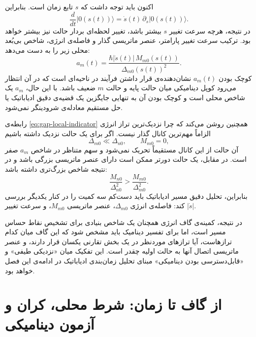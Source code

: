 اکنون باید توجه داشت که $s$ تابع زمان است. بنابراین
\begin{equation}
	\frac{d}{dt}|0(s(t))\rangle
	=
	\dot{s}(t)\,\partial_s|0(s(t))\rangle.
	\label{eq:time-dependent-ground-state}
\end{equation}
در نتیجه، هرچه سرعت تغییر $s$ بیشتر باشد، تغییر لحظه‌ای بردار حالت
نیز بیشتر خواهد بود. ترکیب سرعت تغییر پارامتر، عنصر ماتریسی گذار و
فاصله‌ی انرژی، شاخص بی‌بُعد محلی زیر را به دست می‌دهد:
\begin{equation}
	a_m(t)
	=
	\frac{
		\hbar|\dot{s}(t)|\,M_{m0}(s(t))
	}{
		\Delta_{m0}(s(t))^2
	}.
	\label{eq:gap-local-indicator}
\end{equation}
کوچک بودن $a_m(t)$ نشان‌دهنده‌ی قرار داشتن فرآیند در ناحیه‌ای است
که در آن انتظار می‌رود کوپل دینامیکی میان حالت پایه و حالت $m$
ضعیف باشد. با این حال، $a_m$ یک شاخص محلی است و کوچک بودن آن به
تنهایی جایگزین یک قضیه‌ی دقیق ادیاباتیک یا حل مستقیم معادله‌ی
شرودینگر نمی‌شود.

رابطه‌ی \eqref{eq:gap-local-indicator} همچنین روشن می‌کند که چرا
نزدیک‌ترین تراز انرژی الزاماً مهم‌ترین کانال گذار نیست. اگر برای
یک حالت نزدیک داشته باشیم
\begin{equation}
	\Delta_{m0}\ll\Delta_{n0},
	\qquad
	M_{m0}=0,
\end{equation}
آن حالت از این کانال مستقیماً تحریک نمی‌شود و سهم متناظر در
شاخص $a_m$ صفر است. در مقابل، یک حالت دورتر ممکن است دارای عنصر
ماتریسی بزرگی باشد و در نتیجه شاخص بزرگ‌تری داشته باشد:
\begin{equation}
	\frac{M_{n0}}{\Delta_{n0}^2}
	>
	\frac{M_{m0}}{\Delta_{m0}^2}.
\end{equation}
بنابراین، تحلیل دقیق مسیر ادیاباتیک باید دست‌کم سه کمیت را در کنار
یکدیگر بررسی کند: فاصله‌ی انرژی $\Delta_{m0}$، عنصر ماتریسی
$M_{m0}$، و سرعت تغییر $|\dot{s}|$.

در نتیجه، کمینه‌ی گاف انرژی همچنان یک شاخص بنیادی برای تشخیص نقاط
حساس مسیر است، اما برای تفسیر دینامیک باید مشخص شود که این گاف
میان کدام ترازهاست، آیا ترازهای موردنظر در یک بخش تقارنی یکسان
قرار دارند، و عنصر ماتریسی اتصال آنها به حالت اولیه چقدر است.
این تفکیک میان «نزدیکی طیفی» و «قابل‌دسترسی بودن دینامیکی» مبنای
تحلیل زمان‌بندی ادیاباتیک در ادامه‌ی این فصل خواهد بود.



%

\section{از گاف تا زمان: شرط محلی، کران و آزمون دینامیکی}
\label{sec:gap-runtime}

